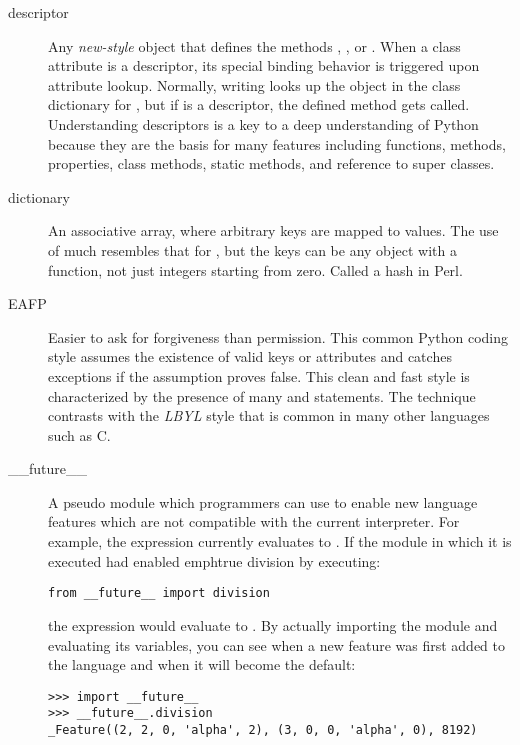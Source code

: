 \begin{description}
\item[descriptor]
Any \emph{new-style} object that defines the methods
{}, , or .
When a class attribute is a descriptor, its special binding behavior
is triggered upon attribute lookup.  Normally, writing  looks
up the object  in the class dictionary for , but if
{} is a descriptor, the defined method gets called.
Understanding descriptors is a key to a deep understanding of Python
because they are the basis for many features including functions,
methods, properties, class methods, static methods, and reference to
super classes.

\item[dictionary]
An associative array, where arbitrary keys are mapped to values.  The
use of  much resembles that for , but the keys
can be any object with a  function, not just
integers starting from zero.  Called a hash in Perl.

\item[EAFP]
Easier to ask for forgiveness than permission.  This common Python
coding style assumes the existence of valid keys or attributes and
catches exceptions if the assumption proves false.  This clean and
fast style is characterized by the presence of many  and
{} statements.  The technique contrasts with the
{}\emph{LBYL} style that is common in many other languages such as C.

\item[__future__]
A pseudo module which programmers can use to enable new language
features which are not compatible with the current interpreter.  For
example, the expression  currently evaluates to .
If the module in which it is executed had enabled emph{true division}
by executing:

\begin{verbatim}
from __future__ import division
\end{verbatim}

the expression  would evaluate to .  By
actually importing the  module and
evaluating its variables, you can see when a new feature was first
added to the language and when it will become the default:

\begin{verbatim}
>>> import __future__
>>> __future__.division
_Feature((2, 2, 0, 'alpha', 2), (3, 0, 0, 'alpha', 0), 8192)
\end{verbatim}


\end{description}
